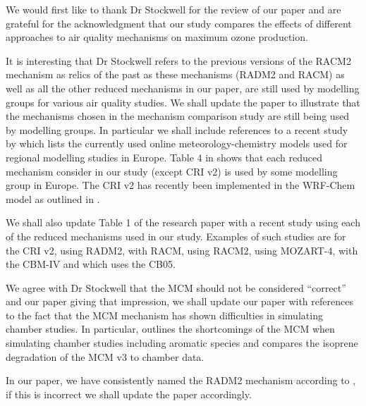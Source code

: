 \documentclass{article}
\begin{document}
We would first like to thank Dr Stockwell for the review of our paper and are grateful for the acknowledgment that our study compares the effects of different approaches to air quality mechanisms on maximum ozone production.

It is interesting that Dr Stockwell refers to the previous versions of the RACM2 mechanism as relics of the past as these mechanisms (RADM2 and RACM) as well as all the other reduced mechanisms in our paper, are still used by modelling groups for various air quality studies. 
We shall update the paper to illustrate that the mechanisms chosen in the mechanism comparison study are still being used by modelling groups.
In particular we shall include references to a recent study by \citet{Baklanov:2014} which lists the currently used online meteorology-chemistry models used for regional modelling studies in Europe.
Table 4 in \citet{Baklanov:2014} shows that each reduced mechanism consider in our study (except CRI v2) is used by some modelling group in Europe.
The CRI v2 has recently been implemented in the WRF-Chem model as outlined in \citet{Archer-Nicholls:2014}.

We shall also update Table 1 of the research paper with a recent study using each of the reduced mechanisms used in our study.
Examples of such studies are \citet{Derwent:2015} for the CRI v2, \citet{Li:2014a} using RADM2, \citet{Ahmadov:2015} with RACM, \citet{Goliff:2015} using RACM2, \citet{Hou:2015} using MOZART-4, \citet{Foster:2014} with the CBM-IV and \citet{Dunker:2015} which uses the CB05.

We agree with Dr Stockwell that the MCM should not be considered ``correct'' and our paper giving that impression, we shall update our paper with references to the fact that the MCM mechanism has shown difficulties in simulating chamber studies.
In particular, \citet{Bloss:2005} outlines the shortcomings of the MCM when simulating chamber studies including aromatic species and \citet{Pinho:2005} compares the isoprene degradation of the MCM v3 to chamber data.

In our paper, we have consistently named the RADM2 mechanism according to \citet{Stockwell:1990}, if this is incorrect we shall update the paper accordingly.



\end{document}
